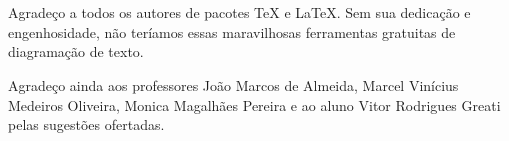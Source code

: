 \chapter*{\agradecimentosnome}
  Agradeço a todos os autores de pacotes \TeX{} e \LaTeX{}. Sem sua dedicação e engenhosidade, não teríamos essas maravilhosas ferramentas gratuitas de diagramação de texto.
  
  Agradeço ainda aos professores João Marcos de Almeida, Marcel Vinícius Medeiros Oliveira, Monica Magalhães Pereira e ao aluno Vitor Rodrigues Greati pelas sugestões ofertadas.
  
  \newpage